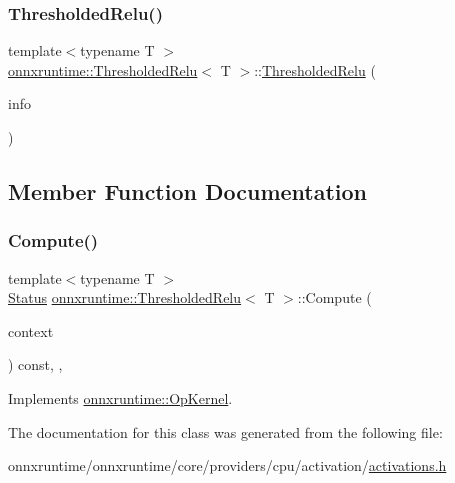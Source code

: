 \subsubsection{\texorpdfstring{Thresholded\+Relu()}{ThresholdedRelu()}}
{\footnotesize\ttfamily template$<$typename T $>$ \\
\mbox{\hyperlink{classonnxruntime_1_1ThresholdedRelu}{onnxruntime\+::\+Thresholded\+Relu}}$<$ T $>$\+::\mbox{\hyperlink{classonnxruntime_1_1ThresholdedRelu}{Thresholded\+Relu}} (\begin{DoxyParamCaption}\item[{const \mbox{\hyperlink{classonnxruntime_1_1OpKernelInfo}{Op\+Kernel\+Info}} \&}]{info }\end{DoxyParamCaption})\hspace{0.3cm}{\ttfamily [inline]}}



\subsection{Member Function Documentation}
\mbox{\label{classonnxruntime_1_1ThresholdedRelu_a95b8d6d4fec428f90a40b42e3667e13b}} 
\subsubsection{\texorpdfstring{Compute()}{Compute()}}
{\footnotesize\ttfamily template$<$typename T $>$ \\
\mbox{\hyperlink{classonnxruntime_1_1common_1_1Status}{Status}} \mbox{\hyperlink{classonnxruntime_1_1ThresholdedRelu}{onnxruntime\+::\+Thresholded\+Relu}}$<$ T $>$\+::Compute (\begin{DoxyParamCaption}\item[{\mbox{\hyperlink{classonnxruntime_1_1OpKernelContext}{Op\+Kernel\+Context}} $\ast$}]{context }\end{DoxyParamCaption}) const\hspace{0.3cm}{\ttfamily [inline]}, {\ttfamily [override]}, {\ttfamily [virtual]}}



Implements \mbox{\hyperlink{classonnxruntime_1_1OpKernel_a9eca8656a78b1b3ab9d3351a12798650}{onnxruntime\+::\+Op\+Kernel}}.



The documentation for this class was generated from the following file\+:\begin{DoxyCompactItemize}
\item 
onnxruntime/onnxruntime/core/providers/cpu/activation/\mbox{\hyperlink{cpu_2activation_2activations_8h}{activations.\+h}}\end{DoxyCompactItemize}
